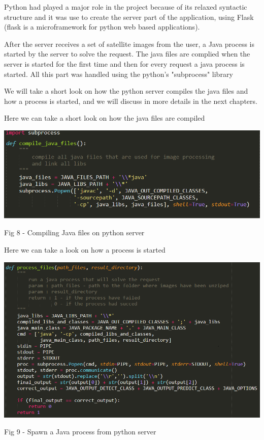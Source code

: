 \documentclass[12pt, a4paper]{report}
\begin{document}
Python had played a major role in the project because of its relaxed syntactic structure and it was use to create the server part of the application, using Flask (flask is a microframework for python web based applications).
\par 

After the server receives a set of satellite images from the user, a Java process is started by the server to solve the request. The java files are complied when the server is started for the first time and then for every request a java process is started. All this part was handled using the python's "subprocess" library
\par
\medskip

We will take a short look on how the python server compiles the java files and how a process is started, and we will discuss in more details in the next chapters.
\medskip

Here we can take a short look on how the java files are compiled
\par
\bigskip
\includegraphics[scale=0.8, center]{python_call_java_1.png}
\begin{center}
Fig 8 - Compiling Java files on python server
\end{center}

\newpage

Here we can take a look on how a process is started
\par
\medskip
\includegraphics[scale=0.7, center]{python_call_java_2.png}
\begin{center}
Fig 9 - Spawn a Java process from python server
\end{center}
\end{document}

